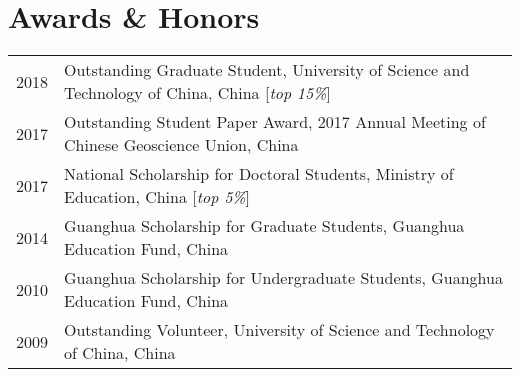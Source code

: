 \section*{Awards \& Honors}

\begin{tabular}{p{} p{}}
2018 & Outstanding Graduate Student, University of Science and Technology of China, China [\textit{top 15\%}] \\
2017 & Outstanding Student Paper Award, 2017 Annual Meeting of Chinese Geoscience Union, China \\
2017 & National Scholarship for Doctoral Students, Ministry of Education, China [\textit{top 5\%}] \\
2014 & Guanghua Scholarship for Graduate Students, Guanghua Education Fund, China \\
2010 & Guanghua Scholarship for Undergraduate Students, Guanghua Education Fund, China \\
2009 & Outstanding Volunteer, University of Science and Technology of China, China \\
\end{tabular}
